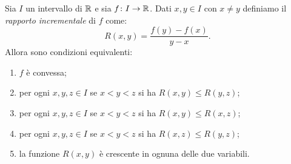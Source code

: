 \begin{lemma}
\mymark{*}%
\label{lemma:547091}%
Sia $I$ un intervallo di ${\mathbb R}$ e sia $f\colon I\to {\mathbb R}$.
Dati $x,y\in I$ con $x\neq y$ definiamo il \emph{rapporto incrementale}
di $f$ come:
\[
  R(x,y) = \frac{f(y) - f(x)}{y-x}.
\]
Allora sono condizioni equivalenti:
\begin{enumerate}
\item $f$ è convessa;
\item per ogni $x,y,z\in I$ se $x<y<z$ si ha $R(x,y)\le R(y,z)$;
\item per ogni $x,y,z\in I$ se $x<y<z$ si ha $R(x,y)\le R(x,z)$;
\item per ogni $x,y,z\in I$ se $x<y<z$ si ha $R(x,z)\le R(y,z)$;
\item la funzione $R(x,y)$ è crescente in ognuna delle due variabili.
\end{enumerate}
\end{lemma}
%
